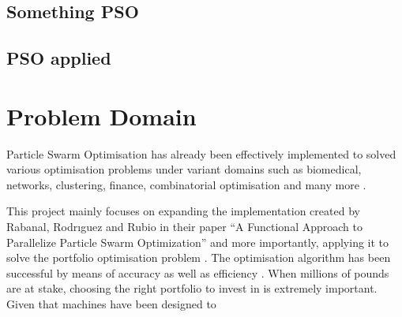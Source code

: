 \documentclass{pdfmx4020}
\begin{document}

  \section{Something PSO} %
  \label{sec:something_pso}
  

  \section{PSO applied} %
  \label{sec:pso_applied}
  

\chapter{Problem Domain}
  
  Particle Swarm Optimisation has already been effectively implemented to solved various optimisation problems \cite{pso_app,pso_app2,pso_app3} under variant domains such as biomedical, networks, clustering, finance, combinatorial optimisation and many more \cite{pso_app_main}. 

  This project mainly focuses on expanding the implementation created by Rabanal, Rodrıguez and Rubio in their paper ``A Functional Approach to Parallelize Particle Swarm Optimization'' and more importantly, applying it to solve the portfolio optimisation problem \cite{marko2}. The optimisation algorithm has been successful by means of accuracy as well as efficiency \cite{haskellPSO}. When millions of pounds are at stake, choosing the right portfolio to invest in is extremely important. Given that machines have been designed to  
\end{document}

